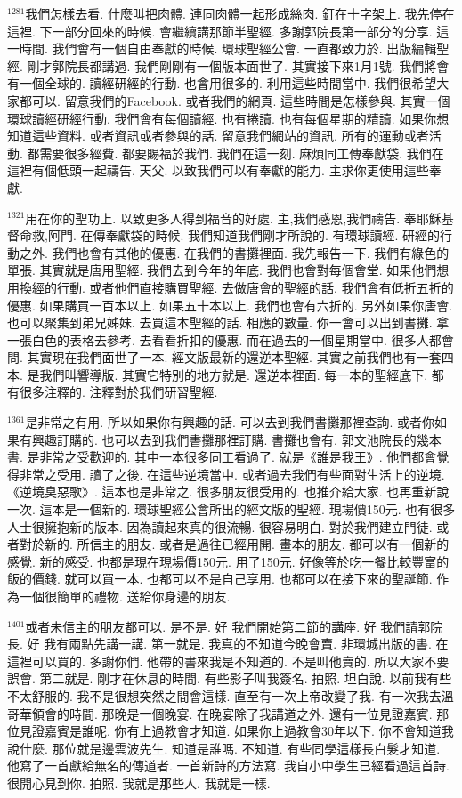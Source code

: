 \documentclass{book}
\begin{document}
$^{1281}$我們怎樣去看.
什麼叫把肉體.
連同肉體一起形成絲肉.
釘在十字架上.
我先停在這裡.
下一部分回來的時候.
會繼續講那節半聖經.
多謝郭院長第一部分的分享.
這一時間.
我們會有一個自由奉獻的時候.
環球聖經公會.
一直都致力於.
出版編輯聖經.
剛才郭院長都講過.
我們剛剛有一個版本面世了.
其實接下來1月1號.
我們將會有一個全球的.
讀經研經的行動.
也會用很多的.
利用這些時間當中.
我們很希望大家都可以.
留意我們的Facebook.
或者我們的網頁.
這些時間是怎樣參與.
其實一個環球讀經研經行動.
我們會有每個讀經.
也有捲讀.
也有每個星期的精讀.
如果你想知道這些資料.
或者資訊或者參與的話.
留意我們網站的資訊.
所有的運動或者活動.
都需要很多經費.
都要賜福於我們.
我們在這一刻.
麻煩同工傳奉獻袋.
我們在這裡有個低頭一起禱告.
天父.
以致我們可以有奉獻的能力.
主求你更使用這些奉獻.

$^{1321}$用在你的聖功上.
以致更多人得到福音的好處.
主,我們感恩,我們禱告.
奉耶穌基督命救,阿門.
在傳奉獻袋的時候.
我們知道我們剛才所說的.
有環球讀經.
研經的行動之外.
我們也會有其他的優惠.
在我們的書攤裡面.
我先報告一下.
我們有綠色的單張.
其實就是唐用聖經.
我們去到今年的年底.
我們也會對每個會堂.
如果他們想用換經的行動.
或者他們直接購買聖經.
去做唐會的聖經的話.
我們會有低折五折的優惠.
如果購買一百本以上.
如果五十本以上.
我們也會有六折的.
另外如果你唐會.
也可以聚集到弟兄姊妹.
去買這本聖經的話.
相應的數量.
你一會可以出到書攤.
拿一張白色的表格去參考.
去看看折扣的優惠.
而在過去的一個星期當中.
很多人都會問.
其實現在我們面世了一本.
經文版最新的還逆本聖經.
其實之前我們也有一套四本.
是我們叫響導版.
其實它特別的地方就是.
還逆本裡面.
每一本的聖經底下.
都有很多注釋的.
注釋對於我們研習聖經.

$^{1361}$是非常之有用.
所以如果你有興趣的話.
可以去到我們書攤那裡查詢.
或者你如果有興趣訂購的.
也可以去到我們書攤那裡訂購.
書攤也會有.
郭文池院長的幾本書.
是非常之受歡迎的.
其中一本很多同工看過了.
就是《誰是我王》.
他們都會覺得非常之受用.
讀了之後.
在這些逆境當中.
或者過去我們有些面對生活上的逆境.
《逆境臭惡歌》.
這本也是非常之.
很多朋友很受用的.
也推介給大家.
也再重新說一次.
這本是一個新的.
環球聖經公會所出的經文版的聖經.
現場價150元.
也有很多人士很擁抱新的版本.
因為讀起來真的很流暢.
很容易明白.
對於我們建立門徒.
或者對於新的.
所信主的朋友.
或者是過往已經用開.
畫本的朋友.
都可以有一個新的感覺.
新的感受.
也都是現在現場價150元.
用了150元.
好像等於吃一餐比較豐富的飯的價錢.
就可以買一本.
也都可以不是自己享用.
也都可以在接下來的聖誕節.
作為一個很簡單的禮物.
送給你身邊的朋友.

$^{1401}$或者未信主的朋友都可以.
是不是.
好 我們開始第二節的講座.
好 我們請郭院長.
好 我有兩點先講一講.
第一就是.
我真的不知道今晚會賣.
非環城出版的書.
在這裡可以買的.
多謝你們.
他帶的書來我是不知道的.
不是叫他賣的.
所以大家不要誤會.
第二就是.
剛才在休息的時間.
有些影子叫我簽名.
拍照.
坦白說.
以前我有些不太舒服的.
我不是很想突然之間會這樣.
直至有一次上帝改變了我.
有一次我去溫哥華領會的時間.
那晚是一個晚宴.
在晚宴除了我講道之外.
還有一位見證嘉賓.
那位見證嘉賓是誰呢.
你有上過教會才知道.
如果你上過教會30年以下.
你不會知道我說什麼.
那位就是邊雲波先生.
知道是誰嗎.
不知道.
有些同學這樣長白髮才知道.
他寫了一首獻給無名的傳道者.
一首新詩的方法寫.
我自小中學生已經看過這首詩.
很開心見到你.
拍照.
我就是那些人.
我就是一樣.
\end{document}

